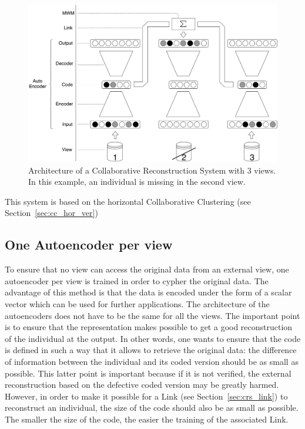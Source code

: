 \documentclass[a4paper]{report}
\begin{document}
\begin{figure}[h]
    \centering
    \includegraphics[scale=.25]{base_system}
    \caption{Architecture of a Collaborative Reconstruction System with 3 views. In this example, an individual is missing in the second view.}
\label{fig:crs}
\end{figure}

This system is based on the horizontal Collaborative Clustering (see Section~\ref{sec:cc_hor_ver})

    \subsection{One Autoencoder per view}

    To ensure that no view can access the original data from an external view, one autoencoder per view is trained in order to cypher the original data. The advantage of this method is that the data is encoded under the form of a scalar vector which can be used for further applications. The architecture of the autoencoders does not have to be the same for all the views. The important point is to ensure that the representation makes possible to get a good reconstruction of the individual at the output. In other words, one wants to ensure that the code is defined in such a way that it allows to retrieve the original data: the difference of information between the individual and its coded version should be as small as possible. This latter point is important because if it is not verified, the external reconstruction based on the defective coded version may be greatly harmed.\\

    However, in order to make it possible for a Link (see Section~\ref{sec:crs_link}) to reconstruct an individual, the size of the code should also be as small as possible. The smaller the size of the code, the easier the training of the associated Link.\\
\end{document}
